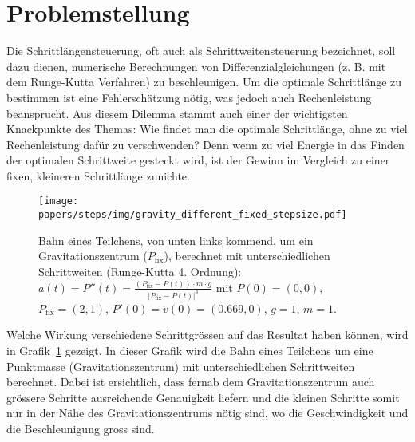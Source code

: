 %
%
%
\section{Problemstellung
\label{steps:section:problemstellung}}
Die Schrittlängensteuerung, oft auch als Schrittweitensteuerung bezeichnet,
soll dazu dienen, numerische Berechnungen von Differenzialgleichungen (z. B. mit dem Runge-Kutta Verfahren) zu beschleunigen.
Um die optimale Schrittlänge zu bestimmen ist eine Fehlerschätzung nötig,
was jedoch auch Rechenleistung beansprucht.
%
Aus diesem Dilemma stammt auch einer der wichtigsten Knackpunkte des Themas:
Wie findet man die optimale Schrittlänge, ohne zu viel Rechenleistung dafür zu verschwenden?
Denn wenn zu viel Energie in das Finden der optimalen Schrittweite gesteckt wird,
ist der Gewinn im Vergleich zu einer fixen, kleineren Schrittlänge zunichte.

\begin{figure}
\centering
\texttt{[image: papers/steps/img/gravity\_different\_fixed\_stepsize.pdf]}
\caption{Bahn eines Teilchens, von unten links kommend,
um ein Gravitationszentrum ($P_\text{fix}$), berechnet mit unterschiedlichen Schrittweiten (Runge-Kutta 4. Ordnung):
$a(t)=P''(t)=\frac{(P_\text{fix}-P(t))\cdot m\cdot g}{|P_\text{fix}-P(t)|^{3}}$
mit $P(0)=(0, 0)$, $P_\text{fix}=(2, 1)$, $P'(0)=v(0)=(0.669, 0)$, $g=1$, $m=1$.
\label{buch:steps:fixed_comparison}}
\end{figure}

Welche Wirkung verschiedene Schrittgrössen
auf das Resultat haben können, wird in Grafik~\ref{buch:steps:fixed_comparison} gezeigt.
In dieser Grafik wird die Bahn eines Teilchens um eine Punktmasse (Gravitationszentrum)
%
%
mit unterschiedlichen Schrittweiten berechnet.
Dabei ist ersichtlich, dass fernab dem Gravitationszentrum auch grössere Schritte
ausreichende Genauigkeit liefern und die kleinen Schritte somit nur in der Nähe des Gravitationszentrums
nötig sind, wo die Geschwindigkeit und die Beschleunigung gross sind.
%
%





